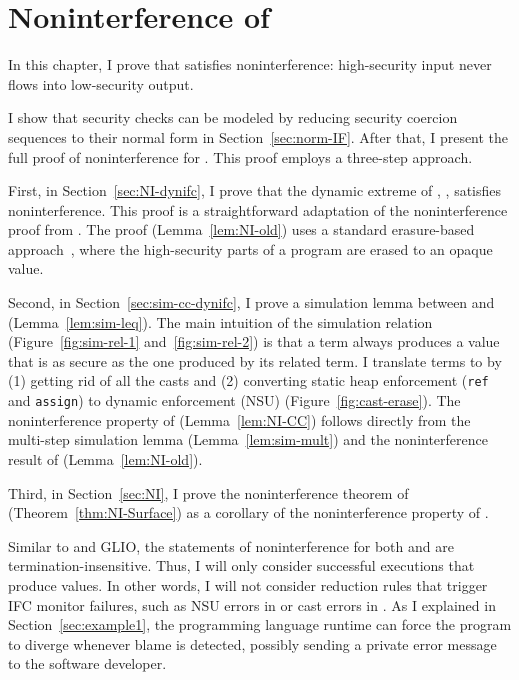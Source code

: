 \chapter{Noninterference of \Surface}
\label{ch:noninterference}

In this chapter, I prove that \Surface satisfies noninterference: high-security
input never flows into low-security output.

I show that security checks can be modeled by reducing security coercion
sequences to their normal form in Section~\ref{sec:norm-IF}. After that, I
present the full proof of noninterference for \Surface. This proof employs a
three-step approach.

First, in Section~\ref{sec:NI-dynifc}, I prove that the dynamic extreme of
\Surface, \DynIFC, satisfies noninterference. This proof is a straightforward
adaptation of the noninterference proof from \textcite{Chen:2022aa}. The proof
(Lemma~\ref{lem:NI-old}) uses a standard erasure-based
approach~\parencite{LI20101974, stefan2011flexible, stefan2012flexible,
  Fennell:2013ab, STEFAN:2017ta}, where the high-security parts of a program are
erased to an opaque value.

Second, in Section~\ref{sec:sim-cc-dynifc}, I prove a simulation lemma between
\CC and \DynIFC (Lemma~\ref{lem:sim-leq}). The main intuition of the simulation
relation (Figure~\ref{fig:sim-rel-1} and~\ref{fig:sim-rel-2}) is that a \CC term
always produces a value that is as secure as the one produced by its related
\DynIFC term. I translate \CC terms to \DynIFC by (1) getting rid of all the
casts and (2) converting static heap enforcement (\texttt{ref} and
\texttt{assign}) to dynamic enforcement (NSU) (Figure~\ref{fig:cast-erase}). The
noninterference property of \CC (Lemma~\ref{lem:NI-CC}) follows directly from
the multi-step simulation lemma (Lemma~\ref{lem:sim-mult}) and the
noninterference result of \DynIFC (Lemma~\ref{lem:NI-old}).

Third, in Section~\ref{sec:NI}, I prove the noninterference theorem of \Surface
(Theorem~\ref{thm:NI-Surface}) as a corollary of the noninterference property of
\CC.

Similar to \GSLRef and GLIO, the statements of noninterference for
both \DynIFC and \CC are termination-insensitive.  Thus, I will only
consider successful executions that produce values. In other words,
I will not consider reduction rules that trigger IFC monitor failures,
such as NSU errors in \DynIFC or cast errors in \CC.  As I explained
in Section~\ref{sec:example1}, the programming language runtime can
force the program to diverge whenever blame is detected, possibly
sending a private error message to the software developer.

